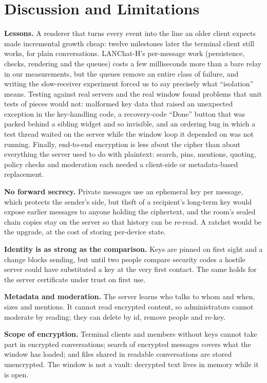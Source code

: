\documentclass[conference]{IEEEtran}
\begin{document}
\section{Discussion and Limitations}\label{sec:discussion}
\textbf{Lessons.} A renderer that turns every event into the line an older client expects made incremental growth cheap: twelve milestones later the terminal client still works, for plain conversations. LANChat-H's per-message work (persistence, checks, rendering and the queues) costs a few milliseconds more than a bare relay in our measurements, but the queues remove an entire class of failure, and writing the slow-receiver experiment forced us to say precisely what ``isolation'' means. Testing against real servers and the real window found problems that unit tests of pieces would not: malformed key data that raised an unexpected exception in the key-handling code, a recovery-code ``Done'' button that was packed behind a sibling widget and so invisible, and an ordering bug in which a test thread waited on the server while the window loop it depended on was not running. Finally, end-to-end encryption is less about the cipher than about everything the server used to do with plaintext: search, pins, mentions, quoting, policy checks and moderation each needed a client-side or metadata-based replacement.

\textbf{No forward secrecy.} Private messages use an ephemeral key per message, which protects the sender's side, but theft of a recipient's long-term key would expose earlier messages to anyone holding the ciphertext, and the room's sealed chain copies stay on the server so that history can be re-read. A ratchet \cite{signal,cohngordon} would be the upgrade, at the cost of storing per-device state.

\textbf{Identity is as strong as the comparison.} Keys are pinned on first sight and a change blocks sending, but until two people compare security codes a hostile server could have substituted a key at the very first contact. The same holds for the server certificate under trust on first use.

\textbf{Metadata and moderation.} The server learns who talks to whom and when, sizes and mentions. It cannot read encrypted content, so administrators cannot moderate by reading; they can delete by id, remove people and re-key.

\textbf{Scope of encryption.} Terminal clients and members without keys cannot take part in encrypted conversations; search of encrypted messages covers what the window has loaded; and files shared in readable conversations are stored unencrypted. The window is not a vault: decrypted text lives in memory while it is open.
\end{document}
